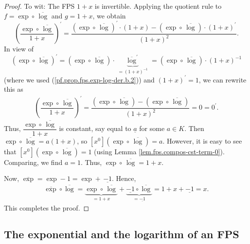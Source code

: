 \begin{proof}
To wit: The FPS $1+x$ is invertible. Applying the quotient rule
to $f=\exp\circ\,\overline{\log}$ and
$g=1+x$, we obtain
\[
\left(\dfrac{\exp\circ\,\overline{\log}}{1+x}\right)^{\prime}
=\dfrac{\left(\exp\circ\,\overline{\log}\right)^{\prime}\cdot\left(
1+x\right)-\left(\exp\circ\,\overline{\log}\right)\cdot\left(
1+x\right)^{\prime}}{\left(1+x\right)^{2}}.
\]
In view of
\[
\left(\exp\circ\,\overline{\log}\right)^{\prime}
=\left(\exp\circ\,\overline{\log}\right)\cdot\underbrace{\overline{\log}^{\prime}
}_{=\left(1+x\right)^{-1}}
=\left(\exp\circ\,\overline{\log}\right)\cdot\left(1+x\right)^{-1}
\]
(where we used (\ref{pf.prop.fps.exp-log-der.b.2}))
and $\left(1+x\right)^{\prime}=1$, we can rewrite this as
\begin{align*}
\left(\dfrac{\exp\circ\,\overline{\log}}{1+x}\right)^{\prime}
=\dfrac{\left(\exp\circ\,\overline{\log}\right)-\left(\exp
\circ\,\overline{\log}\right)}{\left(1+x\right)^{2}}=0=0^{\prime}.
\end{align*}
Thus,
$\dfrac{\exp\circ\,\overline{\log}}{1+x}$ is constant, say equal to $\underline{a}$ for some $a\in K$.
Then $\exp\circ\,\overline{\log}=a\left(1+x\right)$, so
$\left[x^{0}\right]\left(\exp\circ\,\overline{\log}\right)=a$.
However, it is easy to see that $\left[x^{0}\right]\left(\exp
\circ\,\overline{\log}\right)=1$
(using Lemma \ref{lem.fps.compos-cst-term-0}).
Comparing, we find $a=1$. Thus, $\exp\circ\,\overline{\log}=1+x$.

Now, $\overline{\exp}=\exp-1=\exp+\,\underline{-1}$. Hence,
\begin{align*}
\overline{\exp}\circ\overline{\log}
=\underbrace{\exp\circ\,\overline{\log}}_{=1+x}+\underbrace{\underline{-1}
\circ\overline{\log}}_{=\underline{-1}}
=1+x+\underline{-1}=x.
\end{align*}
This completes the proof.
\end{proof}

\subsection{The exponential and the logarithm of an FPS}

